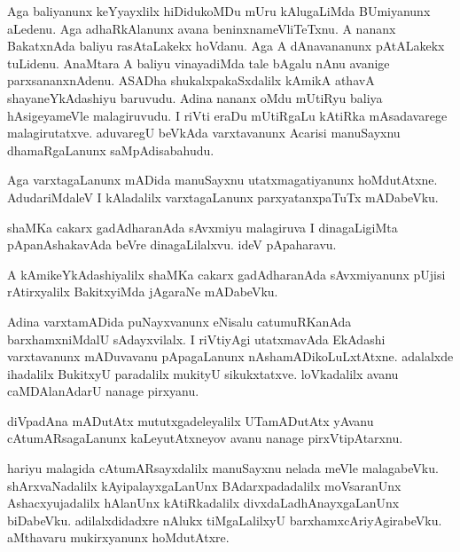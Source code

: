 \documentclass{article}
\begin{document}
\begin{mn}%
Aga baliyanunx keYyayxlilx hiDidukoMDu mUru kAlugaLiMda BUmiyanunx aLedenu. Aga adhaRkAlanunx avana 
beninxnameVliTeTxnu. A nananx BakatxnAda baliyu rasAtaLakekx hoVdanu. Aga A dAnavananunx 
pAtALakekx tuLidenu. AnaMtara A baliyu vinayadiMda tale bAgalu nAnu avanige parxsananxnAdenu. 
ASADha shukalxpakaSxdalilx kAmikA athavA shayaneYkAdashiyu baruvudu. Adina nananx oMdu mUtiRyu 
baliya hAsigeyameVle malagiruvudu. I riVti eraDu mUtiRgaLu kAtiRka mAsadavarege malagirutatxve. 
aduvaregU beVkAda varxtavanunx Acarisi manuSayxnu dhamaRgaLanunx saMpAdisabahudu.
\end{mn}

\begin{mn}%
Aga varxtagaLanunx mADida manuSayxnu utatxmagatiyanunx hoMdutAtxne. AdudariMdaleV I kAladalilx 
varxtagaLanunx parxyatanxpaTuTx mADabeVku.
\end{mn}

\begin{mn}%
shaMKa cakarx gadAdharanAda sAvxmiyu malagiruva I dinagaLigiMta pApanAshakavAda beVre 
dinagaLilalxvu. ideV pApaharavu.
\end{mn}

\begin{mn}%
A kAmikeYkAdashiyalilx shaMKa cakarx gadAdharanAda sAvxmiyanunx pUjisi rAtirxyalilx BakitxyiMda 
jAgaraNe mADabeVku.
\end{mn}

\begin{mn}%
Adina varxtamADida puNayxvanunx eNisalu catumuRKanAda barxhamxniMdalU sAdayxvilalx. I riVtiyAgi 
utatxmavAda EkAdashi varxtavanunx mADuvavanu pApagaLanunx nAshamADikoLuLxtAtxne. adalalxde 
ihadalilx BukitxyU paradalilx mukityU sikukxtatxve. loVkadalilx avanu caMDAlanAdarU nanage pirxyanu.
\end{mn}

\begin{mn}%
diVpadAna mADutAtx mututxgadeleyalilx UTamADutAtx yAvanu cAtumARsagaLanunx kaLeyutAtxneyov avanu 
nanage pirxVtipAtarxnu.
\end{mn}

\begin{mn}%
hariyu malagida cAtumARsayxdalilx manuSayxnu nelada meVle malagabeVku. shArxvaNadalilx 
kAyipalayxgaLanUnx BAdarxpadadalilx moVsaranUnx Ashacxyujadalilx hAlanUnx kAtiRkadalilx 
divxdaLadhAnayxgaLanUnx biDabeVku. adilalxdidadxre nAlukx tiMgaLalilxyU barxhamxcAriyAgirabeVku. 
aMthavaru mukirxyanunx hoMdutAtxre.
\end{mn}
\end{document}
